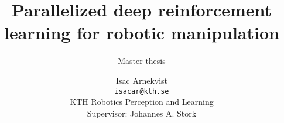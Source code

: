 \documentclass[12pt,a4paper]{scrartcl}
\title{Parallelized deep reinforcement learning for robotic manipulation}
\subtitle{Master thesis}
\author{Isac Arnekvist \\ \texttt{isacar@kth.se} \\ KTH Robotics Perception and Learning \\ Supervisor: Johannes A. Stork}
\begin{document}
\maketitle
\tableofcontents










{}

\end{document}
